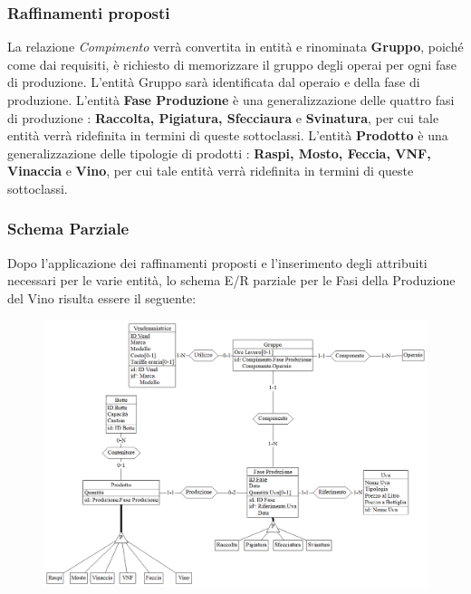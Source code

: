 \documentclass{article}
\begin{document}
\subsubsection{Raffinamenti proposti}


La relazione \textit{Compimento} verrà convertita in entità e rinominata \textbf{Gruppo}, poiché come dai requisiti, è richiesto di memorizzare il gruppo degli operai per ogni fase di produzione.
L'entità Gruppo sarà identificata dal operaio e della fase di produzione.
\newline
\newline
L'entità \textbf{Fase Produzione} è una generalizzazione delle quattro fasi di produzione : \textbf{Raccolta, Pigiatura, Sfecciaura} e \textbf{Svinatura}, per cui tale entità verrà ridefinita in termini di queste sottoclassi.
\newline
\newline
L'entità \textbf{Prodotto} è una generalizzazione delle tipologie di prodotti : \textbf{Raspi, Mosto, Feccia, VNF, Vinaccia} e \textbf{Vino}, per cui tale entità verrà ridefinita in termini di queste sottoclassi.

\newpage 
\subsubsection{Schema Parziale}
Dopo l'applicazione dei raffinamenti proposti e l'inserimento degli attribuiti necessari per le varie entità, lo schema E/R parziale per le Fasi della Produzione del Vino risulta essere il seguente:
\begin{figure}[htbp]
\centering
\includegraphics[width=1\textwidth]{img/Fasi_Parziale}
\end{figure}
\end{document}
